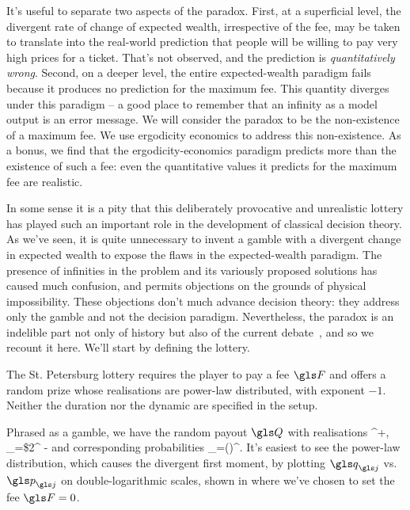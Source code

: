 It's useful to separate two aspects of the paradox. First, at a superficial level, the divergent
rate of change of expected wealth, irrespective of the fee, may be taken to translate into
the real-world prediction that people will be willing to pay very high prices for a ticket. 
That's not observed, and the prediction is {\it quantitatively wrong}. Second, on a deeper 
level, the entire expected-wealth paradigm fails because it produces no prediction for 
the maximum fee. This quantity diverges under this paradigm -- a good place to remember
that an infinity as a model output is an error message. We will consider the paradox to be
the non-existence of a maximum fee. We use ergodicity economics to address this non-existence. As a bonus, we find that the ergodicity-economics paradigm predicts more than the existence of such a fee: even the quantitative values it predicts for the maximum fee are realistic.

In some sense it is a pity that this deliberately provocative and unrealistic lottery has played 
such an important role in the development of classical decision theory.  As we've seen, it is 
quite unnecessary to invent 
a gamble with a divergent change in expected wealth to expose the flaws in the expected-wealth 
paradigm. The presence of infinities in the problem and its variously proposed solutions has 
caused much confusion, and permits objections on the grounds of physical impossibility. These 
objections don't much advance decision theory: they address only the gamble and 
not the decision paradigm. Nevertheless, the paradox is an indelible part not only of history but 
also of the current debate~\cite{Peters2011b}, and so we recount it here. We'll start by defining 
the lottery.

The St. Petersburg lottery requires the player to pay a fee $\F$ and offers a random 
prize whose realisations are power-law distributed, with exponent $-1$. Neither the duration
nor the dynamic are specified in the setup. 

Phrased as a gamble, we have the random payout $\Q$ with realisations 
\be
\forall \gj \in {}^+, \q_{\gj}=\$2^{} -\F
{}
\ee
and corresponding probabilities 
\be
\p_\gj=\left(\right)^\gj.
\ee
It's easiest to see the power-law distribution, which causes the divergent first moment, by plotting
$\q_\gj$ vs. $\p_\gj$ on double-logarithmic scales, shown in  where we've
chosen to set the fee $\F=0$.


